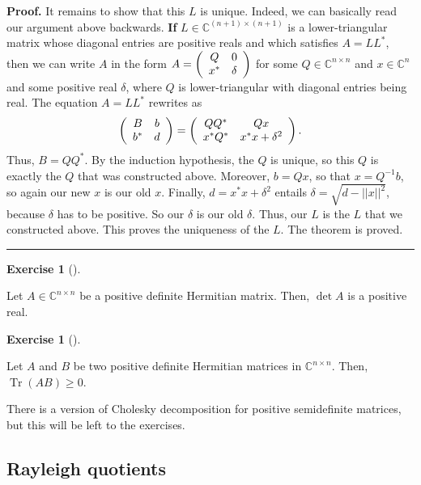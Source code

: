 \documentclass[numbers=enddot,12pt,final,onecolumn,notitlepage]{scrartcl}%
\newcounter{exer}
\numberwithin{exer}{subsection}
\theoremstyle{definition}
\newtheorem{exmp}[exer]{Exercise}
\newenvironment{exercise}[1][]
{\begin{exmp}[#1]\begin{leftbar}}
{\end{leftbar}\end{exmp}}
\newenvironment{proof}[1][Proof]{\noindent\textbf{#1.} }{\ \rule{0.5em}{0.5em}}
\begin{document}
\begin{proof}
It remains to show that this $L$ is unique. Indeed, we can basically read our
argument above backwards. \textbf{If} $L\in\mathbb{C}^{\left(  n+1\right)
\times\left(  n+1\right)  }$ is a lower-triangular matrix whose diagonal
entries are positive reals and which satisfies $A=LL^{\ast}$, then we can
write $A$ in the form $A=\left(
\begin{array}
[c]{cc}%
Q & 0\\
x^{\ast} & \delta
\end{array}
\right)  $ for some $Q\in\mathbb{C}^{n\times n}$ and $x\in\mathbb{C}^{n}$ and
some positive real $\delta$, where $Q$ is lower-triangular with diagonal
entries being real. The equation $A=LL^{\ast}$ rewrites as%
\[
\left(
\begin{array}
[c]{cc}%
B & b\\
b^{\ast} & d
\end{array}
\right)  =\left(
\begin{array}
[c]{cc}%
QQ^{\ast} & Qx\\
x^{\ast}Q^{\ast} & x^{\ast}x+\delta^{2}%
\end{array}
\right)  .
\]
Thus, $B=QQ^{\ast}$. By the induction hypothesis, the $Q$ is unique, so this
$Q$ is exactly the $Q$ that was constructed above. Moreover, $b=Qx$, so that
$x=Q^{-1}b$, so again our new $x$ is our old $x$. Finally, $d=x^{\ast}%
x+\delta^{2}$ entails $\delta=\sqrt{d-\left\vert \left\vert x\right\vert
\right\vert ^{2}}$, because $\delta$ has to be positive. So our $\delta$ is
our old $\delta$. Thus, our $L$ is the $L$ that we constructed above. This
proves the uniqueness of the $L$. The theorem is proved.
\end{proof}

\begin{exercise}
Let $A\in\mathbb{C}^{n\times n}$ be a positive definite Hermitian matrix.
Then, $\det A$ is a positive real.
\end{exercise}

\begin{exercise}
Let $A$ and $B$ be two positive definite Hermitian matrices in $\mathbb{C}%
^{n\times n}$. Then, $\operatorname*{Tr}\left(  AB\right)  \geq0$.
\end{exercise}

There is a version of Cholesky decomposition for positive semidefinite
matrices, but this will be left to the exercises.

\subsection{Rayleigh quotients}
\end{document}
